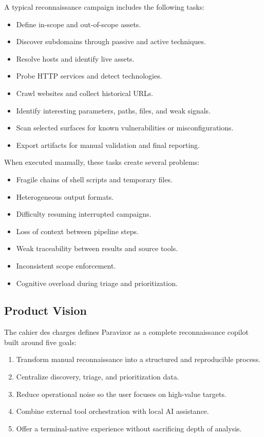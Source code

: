 \documentclass[a4paper,12pt]{article}
\begin{document}
A typical reconnaissance campaign includes the following tasks:

\begin{itemize}
    \item Define in-scope and out-of-scope assets.
    \item Discover subdomains through passive and active techniques.
    \item Resolve hosts and identify live assets.
    \item Probe HTTP services and detect technologies.
    \item Crawl websites and collect historical URLs.
    \item Identify interesting parameters, paths, files, and weak signals.
    \item Scan selected surfaces for known vulnerabilities or misconfigurations.
    \item Export artifacts for manual validation and final reporting.
\end{itemize}

When executed manually, these tasks create several problems:

\begin{itemize}
    \item Fragile chains of shell scripts and temporary files.
    \item Heterogeneous output formats.
    \item Difficulty resuming interrupted campaigns.
    \item Loss of context between pipeline steps.
    \item Weak traceability between results and source tools.
    \item Inconsistent scope enforcement.
    \item Cognitive overload during triage and prioritization.
\end{itemize}

\subsection{Product Vision}

The cahier des charges defines Paravizor as a complete reconnaissance copilot built around five goals:

\begin{enumerate}
    \item Transform manual reconnaissance into a structured and reproducible process.
    \item Centralize discovery, triage, and prioritization data.
    \item Reduce operational noise so the user focuses on high-value targets.
    \item Combine external tool orchestration with local AI assistance.
    \item Offer a terminal-native experience without sacrificing depth of analysis.
\end{enumerate}
\end{document}
